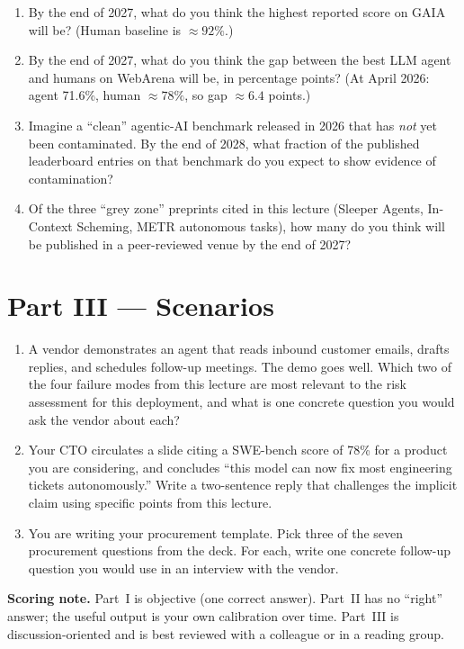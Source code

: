 \documentclass[11pt,a4paper]{article}
\begin{document}
\begin{enumerate}[resume, label=Q\arabic*.]

\item By the end of 2027, what do you think the highest reported score
      on GAIA will be? (Human baseline is $\approx 92\%$.)

\item By the end of 2027, what do you think the gap between the best
      LLM agent and humans on WebArena will be, in percentage points?
      (At April 2026: agent 71.6\%, human $\approx 78\%$, so gap
      $\approx 6.4$ points.)

\item Imagine a ``clean'' agentic-AI benchmark released in 2026 that
      has \emph{not} yet been contaminated. By the end of 2028, what
      fraction of the published leaderboard entries on that benchmark
      do you expect to show evidence of contamination?

\item Of the three ``grey zone'' preprints cited in this lecture
      (Sleeper Agents, In-Context Scheming, METR autonomous tasks),
      how many do you think will be published in a peer-reviewed venue
      by the end of 2027?

\end{enumerate}

\section*{Part III --- Scenarios}

\begin{enumerate}[resume, label=Q\arabic*.]

\item A vendor demonstrates an agent that reads inbound customer
      emails, drafts replies, and schedules follow-up meetings. The
      demo goes well. Which two of the four failure modes from this
      lecture are most relevant to the risk assessment for this
      deployment, and what is one concrete question you would ask the
      vendor about each?

\item Your CTO circulates a slide citing a SWE-bench score of 78\% for
      a product you are considering, and concludes ``this model can now
      fix most engineering tickets autonomously.'' Write a two-sentence
      reply that challenges the implicit claim using specific points
      from this lecture.

\item You are writing your procurement template. Pick three of the
      seven procurement questions from the deck. For each, write one
      concrete follow-up question you would use in an interview with
      the vendor.

\end{enumerate}

\vspace{2em}

\noindent\textbf{Scoring note.} Part~I is objective (one correct
answer). Part~II has no ``right'' answer; the useful output is your
own calibration over time. Part~III is discussion-oriented and is
best reviewed with a colleague or in a reading group.
\end{document}
